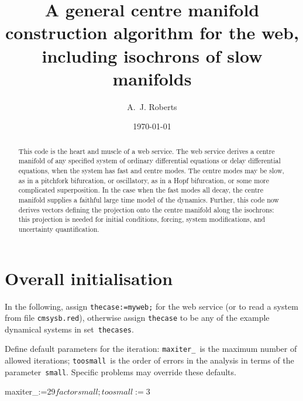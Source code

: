 \documentclass[11pt,a5paper]{article}
\title{A general centre manifold construction algorithm for the web, including isochrons of slow manifolds}
\author{A.~J. Roberts}
\date{\today}
\begin{document}
\maketitle

\begin{abstract}
This code is the heart and muscle of a web service.
The web service derives a centre manifold of any specified system of ordinary differential equations or delay differential equations, when the system has fast and centre modes. 
The centre modes may be slow, as in a pitchfork bifurcation, or oscillatory, as in a Hopf bifurcation, or some more complicated superposition. 
In the case when the fast modes all decay, the centre manifold supplies a faithful large time model of the dynamics. 
Further, this code now derives vectors defining the projection onto the centre manifold along the isochrons: this projection is needed for initial conditions, forcing, system modifications, and uncertainty quantification.
\end{abstract}

\tableofcontents

\section{Overall initialisation}

In the following, assign \verb|thecase:=myweb;| for the web service (or to read a system from file \verb|cmsysb.red|), otherwise assign \verb|thecase| to be any of the example dynamical systems in set~\verb|thecases|.

Define default parameters for the iteration:
\verb|maxiter_|~is the maximum number of allowed iterations;
\verb|toosmall|~is the order of errors in the analysis in terms of the parameter~\verb|small|.
Specific problems may override these defaults.

\begin{reduce}
maxiter_:=29$
factor small; 
toosmall:=3$
\end{reduce}
\end{document}
